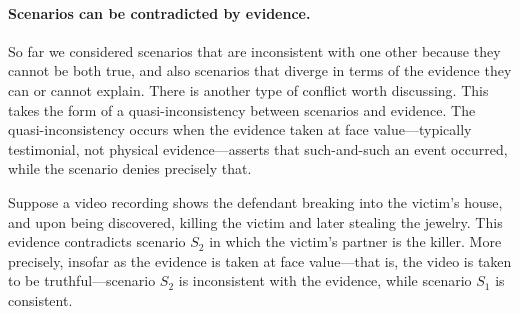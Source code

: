 \documentclass[10pt]{article}
\begin{document}
\paragraph{Scenarios can be contradicted by evidence.} So far we considered scenarios that are 
inconsistent with one other because 
they cannot be both true, and also scenarios that diverge in terms of 
the evidence they can or cannot explain. There is another type of conflict worth discussing. This takes the form of 
a quasi-inconsistency between scenarios and evidence. The quasi-inconsistency occurs 
when the evidence taken at face value---typically testimonial, not physical evidence---asserts 
that such-and-such an event occurred, while the scenario 
denies precisely that. 

Suppose a video recording shows the defendant 
breaking into the victim's house, and upon being discovered, 
killing the victim and later stealing the jewelry. 
This evidence contradicts scenario $S_2$ 
in which the victim's partner is the killer. More precisely, insofar as the evidence 
is taken at face value---that is, the video is taken to be truthful---scenario $S_2$ 
is inconsistent with the evidence, while scenario $S_1$ is consistent. 

\end{document}
